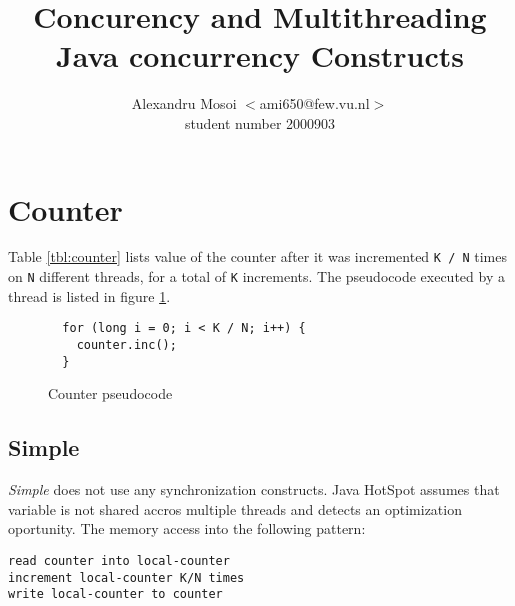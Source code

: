 \documentclass[12pt]{article}
\title{Concurency and Multithreading\\
       Java concurrency Constructs}
\author{Alexandru Mosoi $<$ami650@few.vu.nl$>$\\
        student number 2000903}
\begin{document}
\maketitle


\section{Counter}

\begin{table}[h!]
  \centering
  \small

  \caption{Counter value for variable N and K = 2.000.000.000 on a 4 logical
  cores processor}
  \label{tbl:counter}
\end{table}


Table \ref{tbl:counter} lists value of the counter after it was incremented
\texttt{K / N} times on \texttt{N} different threads, for a total of
\texttt{K} increments. The pseudocode executed by a thread is listed in
figure \ref{fig:counter-pseudocode}.

\begin{figure}[h!]
  \begin{verbatim}
  for (long i = 0; i < K / N; i++) {
    counter.inc();
  }
  \end{verbatim}
  \caption{Counter pseudocode}
  \label{fig:counter-pseudocode}
\end{figure}

\subsection{Simple}
\label{ssec:simple}

\emph{Simple} does not use any synchronization constructs. Java
HotSpot assumes that variable is not shared accros multiple threads and
detects an optimization oportunity. The memory access into the following
pattern:

\begin{verbatim}
read counter into local-counter
increment local-counter K/N times
write local-counter to counter
\end{verbatim}
\end{document}
